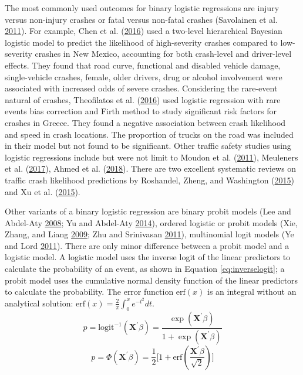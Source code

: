 \documentclass[12pt]{book}
\numberwithin{equation}{chapter}
\begin{document}
The most commonly used outcomes for binary logistic regressions are injury versus non-injury crashes or fatal versus non-fatal crashes (Savolainen et al. \protect\hyperlink{ref-savolainen2011statistical}{2011}). For example, Chen et al. (\protect\hyperlink{ref-chen2016driver}{2016}) used a two-level hierarchical Bayesian logistic model to predict the likelihood of high-severity crashes compared to low-severity crashes in New Mexico, accounting for both crash-level and driver-level effects. They found that road curve, functional and disabled vehicle damage, single-vehicle crashes, female, older drivers, drug or alcohol involvement were associated with increased odds of severe crashes. Considering the rare-event natural of crashes, Theofilatos et al. (\protect\hyperlink{ref-theofilatos2016predicting}{2016}) used logistic regression with rare events bias correction and Firth method to study significant risk factors for crashes in Greece. They found a negative association between crash likelihood and speed in crash locations. The proportion of trucks on the road was included in their model but not found to be significant. Other traffic safety studies using logistic regressions include but were not limit to Moudon et al. (\protect\hyperlink{ref-moudon2011risk}{2011}), Meuleners et al. (\protect\hyperlink{ref-meuleners2017determinants}{2017}), Ahmed et al. (\protect\hyperlink{ref-ahmed2018effects}{2018}). There are two excellent systematic reviews on traffic crash likelihood predictions by Roshandel, Zheng, and Washington (\protect\hyperlink{ref-roshandel2015impact}{2015}) and Xu et al. (\protect\hyperlink{ref-xu2015calibration}{2015}).

Other variants of a binary logistic regression are binary probit models (Lee and Abdel-Aty \protect\hyperlink{ref-lee2008presence}{2008}; Yu and Abdel-Aty \protect\hyperlink{ref-yu2014using}{2014}), ordered logistic or probit models (Xie, Zhang, and Liang \protect\hyperlink{ref-xie2009crash}{2009}; Zhu and Srinivasan \protect\hyperlink{ref-zhu2011comprehensive}{2011}), multinomial logit models (Ye and Lord \protect\hyperlink{ref-ye2011investigation}{2011}). There are only minor difference between a probit model and a logistic model. A logistic model uses the inverse logit of the linear predictors to calculate the probability of an event, as shown in Equation \eqref{eq:inverselogit}; a probit model uses the cumulative normal density function of the linear predictors to calculate the probability. The error function \(\text{erf}(x)\) is an integral without an analytical solution: \(\text{erf}(x) = \frac{2}{\pi}\int_0^xe^{-t^2}dt\).
\begin{equation}
p = \text{logit}^{-1}(\mathbf{X}^\prime\beta) = \frac{\exp (\mathbf{X}^\prime\beta)}{1 + \exp (\mathbf{X}^\prime\beta)}
\label{eq:inverselogit}
\end{equation}
\begin{equation}
p = \Phi(\mathbf{X}^\prime\beta) = \frac{1}{2}\Big[1+\text{erf}(\frac{\mathbf{X}^\prime\beta}{\sqrt 2})\Big]
\label{eq:inverselogit}
\end{equation}
\end{document}
